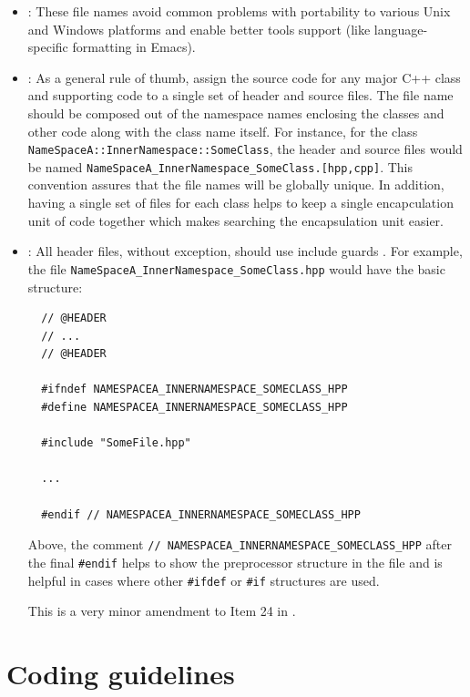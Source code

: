 \begin{itemize}

{}\item\NOSFFileExtension: These file names avoid common problems with
portability to various Unix and Windows platforms and enable better tools
support (like language-specific formatting in Emacs).

{}\item\NOSFClassFiles: As a general rule of thumb, assign the source
code for any major C++ class and supporting code to a single set of
header and source files.  The file name should be composed out of the
namespace names enclosing the classes and other code along with the
class name itself.  For instance, for the class
{}\texttt{NameSpaceA\-::InnerNamespace\-::SomeClass}, the header and
source files would be named
{}\texttt{NameSpaceA\-\_InnerNamespace\-\_SomeClass.[hpp,cpp]}.  This
convention assures that the file names will be globally unique.  In
addition, having a single set of files for each class helps to keep a
single encapculation unit of code together which makes searching the
encapsulation unit easier.

{}\item\NOSFIncludeGuards: All header files, without exception, should use include
guards {}\cite[Item 24]{C++CodingStandards05}.  For example, the file
{}\texttt{NameSpaceA\-\_InnerNamespace\-\_SomeClass.hpp} would have the basic
structure:

{\small\begin{verbatim}
  // @HEADER
  // ...
  // @HEADER

  #ifndef NAMESPACEA_INNERNAMESPACE_SOMECLASS_HPP
  #define NAMESPACEA_INNERNAMESPACE_SOMECLASS_HPP

  #include "SomeFile.hpp"

  ...

  #endif // NAMESPACEA_INNERNAMESPACE_SOMECLASS_HPP
\end{verbatim}}

Above, the comment {}\texttt{//
NAMESPACEA\-\_INNERNAMESPACE\-\_SOMECLASS\-\_HPP} after the final
{}\texttt{\#endif} helps to show the preprocessor structure in the file and is
helpful in cases where other {}\texttt{\#ifdef} or {}\texttt{\#if} structures
are used.

This is a very minor amendment to Item 24 in {}\cite{C++CodingStandards05}.

\end{itemize}


%
\section{Coding guidelines}
\label{thyracodingguidelines:codingguidelines:sec}
%

